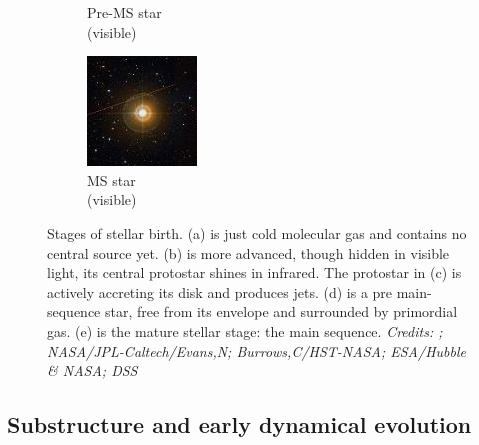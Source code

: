 \begin{figure}
\begin{subfigure}[b]{0.19\textwidth}
        \caption{Pre-MS star \\ \centering (visible)}
        \label{Fig:0_proto_4}
    \end{subfigure}  
        \begin{subfigure}[b]{0.19\textwidth}
        \includegraphics[width=\textwidth]{Figures/0_proto_5.jpg}
        \caption{MS star \\\centering (visible) }
        \label{Fig:0_proto_5}
    \end{subfigure}
     \caption[Stages of stellar birth]{Stages of stellar birth. (a) is just cold molecular gas and contains no central source yet. (b) is more advanced, though hidden in visible light, its central protostar shines in infrared. The protostar in (c) is actively accreting its disk and produces jets. (d) is a pre main-sequence star, free from its envelope and surrounded by primordial gas. (e) is the mature stellar stage: the main sequence. \textit{Credits: \protect\cite{Kandori2005}; NASA/JPL-Caltech/Evans,N; Burrows,C/HST-NASA; ESA/Hubble \& NASA; DSS}}
     \label{Fig:0_protoevolution}
\end{figure}








\subsection{Substructure and early dynamical evolution}

